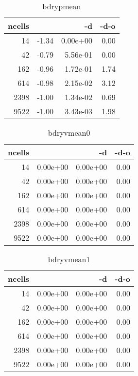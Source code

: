 \documentclass[11pt]{article}
\begin{document}
%
%
\begin{table}[!htbp]
\begin{center}
\begin{tabular}{r||r|r|r}
ncells           &                  & -d               & -d-o            \\\hline\hline
             14&     -1.34&  0.00e+00&    0.00\\\hline
             42&     -0.79&  5.56e-01&    0.00\\\hline
            162&     -0.96&  1.72e-01&    1.74\\\hline
            614&     -0.98&  2.15e-02&    3.12\\\hline
           2398&     -1.00&  1.34e-02&    0.69\\\hline
           9522&     -1.00&  3.43e-03&    1.98\\\hline
\end{tabular}
\caption{bdrypmean}
\end{center}
\label{tab:bdrypmean}
\end{table}
%
%
\begin{table}[!htbp]
\begin{center}
\begin{tabular}{r||r|r|r}
ncells           &                  & -d               & -d-o            \\\hline\hline
             14&  0.00e+00&  0.00e+00&    0.00\\\hline
             42&  0.00e+00&  0.00e+00&    0.00\\\hline
            162&  0.00e+00&  0.00e+00&    0.00\\\hline
            614&  0.00e+00&  0.00e+00&    0.00\\\hline
           2398&  0.00e+00&  0.00e+00&    0.00\\\hline
           9522&  0.00e+00&  0.00e+00&    0.00\\\hline
\end{tabular}
\caption{bdryvmean0}
\end{center}
\label{tab:bdryvmean0}
\end{table}
%
%
\begin{table}[!htbp]
\begin{center}
\begin{tabular}{r||r|r|r}
ncells           &                  & -d               & -d-o            \\\hline\hline
             14&  0.00e+00&  0.00e+00&    0.00\\\hline
             42&  0.00e+00&  0.00e+00&    0.00\\\hline
            162&  0.00e+00&  0.00e+00&    0.00\\\hline
            614&  0.00e+00&  0.00e+00&    0.00\\\hline
           2398&  0.00e+00&  0.00e+00&    0.00\\\hline
           9522&  0.00e+00&  0.00e+00&    0.00\\\hline
\end{tabular}
\caption{bdryvmean1}
\end{center}
\label{tab:bdryvmean1}
\end{table}
\end{document}
